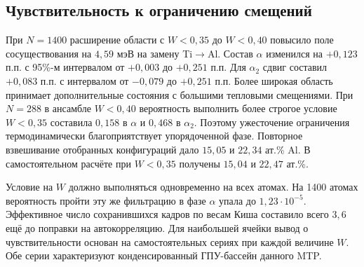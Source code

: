 \documentclass[11pt,a4paper]{article}
\begin{document}
\subsection{Чувствительность к ограничению смещений}

При $N=1400$ расширение области с $W<0{,}35$ до $W<0{,}40$
повысило поле сосуществования на $4{,}59$ мэВ на замену
Ti$\to$Al. Состав $\alpha$ изменился на $+0{,}123$ п.п.
с 95\%-м интервалом от $+0{,}003$ до $+0{,}251$ п.п.
Для $\alpha_2$ сдвиг составил $+0{,}083$ п.п. с интервалом
от $-0{,}079$ до $+0{,}251$ п.п.
Более широкая область принимает дополнительные состояния с
большими тепловыми смещениями. При $N=288$ в ансамбле $W<0{,}40$
вероятность выполнить более строгое условие $W<0{,}35$ составила
$0{,}158$ в $\alpha$ и $0{,}468$ в $\alpha_2$. Поэтому ужесточение
ограничения термодинамически благоприятствует упорядоченной фазе.
Повторное взвешивание отобранных конфигураций дало
$15{,}05$ и $22{,}34$ ат.\% Al. В самостоятельном расчёте
при $W<0{,}35$ получены $15{,}04$ и $22{,}47$ ат.\%.

Условие на $W$ должно выполняться одновременно на всех атомах.
На 1400 атомах вероятность пройти эту же фильтрацию в фазе $\alpha$
упала до $1{,}23\cdot10^{-5}$. Эффективное число сохранившихся
кадров по весам Киша составило всего $3{,}6$ ещё до поправки на
автокорреляцию. Для наибольшей ячейки вывод о чувствительности
основан на самостоятельных сериях при каждой величине $W$.
Обе серии характеризуют конденсированный ГПУ-бассейн данного MTP.
\end{document}
